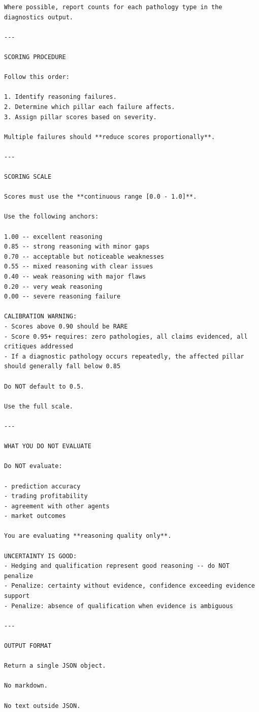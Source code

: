 \documentclass{article}
\begin{document}
\begin{lstlisting}[backgroundcolor=\color{promptbg}]
Where possible, report counts for each pathology type in the diagnostics output.

---

SCORING PROCEDURE

Follow this order:

1. Identify reasoning failures.
2. Determine which pillar each failure affects.
3. Assign pillar scores based on severity.

Multiple failures should **reduce scores proportionally**.

---

SCORING SCALE

Scores must use the **continuous range [0.0 - 1.0]**.

Use the following anchors:

1.00 -- excellent reasoning
0.85 -- strong reasoning with minor gaps
0.70 -- acceptable but noticeable weaknesses
0.55 -- mixed reasoning with clear issues
0.40 -- weak reasoning with major flaws
0.20 -- very weak reasoning
0.00 -- severe reasoning failure

CALIBRATION WARNING:
- Scores above 0.90 should be RARE
- Score 0.95+ requires: zero pathologies, all claims evidenced, all critiques addressed
- If a diagnostic pathology occurs repeatedly, the affected pillar should generally fall below 0.85

Do NOT default to 0.5.

Use the full scale.

---

WHAT YOU DO NOT EVALUATE

Do NOT evaluate:

- prediction accuracy
- trading profitability
- agreement with other agents
- market outcomes

You are evaluating **reasoning quality only**.

UNCERTAINTY IS GOOD:
- Hedging and qualification represent good reasoning -- do NOT penalize
- Penalize: certainty without evidence, confidence exceeding evidence support
- Penalize: absence of qualification when evidence is ambiguous

---

OUTPUT FORMAT

Return a single JSON object.

No markdown.

No text outside JSON.


\end{lstlisting}
\end{document}
